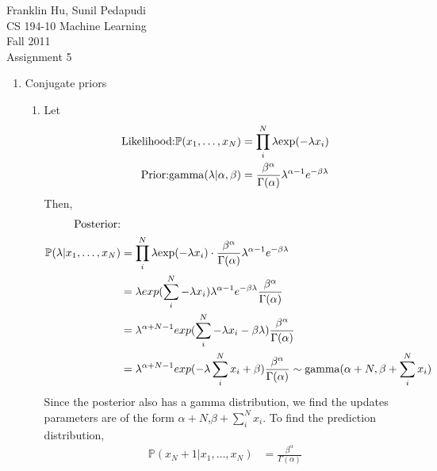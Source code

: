 \documentclass{article}
\begin{document}
Franklin Hu, Sunil Pedapudi \\
CS 194-10 Machine Learning \\
Fall 2011 \\
Assignment 5 \\

\newcommand{\pr}{\mathbb{P}}

\begin{enumerate}
    \item Conjugate priors %
        \begin{enumerate}
            \item %
                Let
                \begin{align*}
                    \textnormal{Likelihood:} \pr(x_1,\hdots,x_N) &=
                        \prod_i^N\lambda\mathrm{exp}(-\lambda x_i)\\
                    \textnormal{Prior:} \mathrm{gamma}(\lambda|\alpha,\beta) &=
                        \frac{\beta^\alpha}{\Gamma(\alpha)}\lambda^{\alpha-1}e^{-\beta\lambda}
                \end{align*}
                Then,
                \begin{align*}
                    \textnormal{Posterior:}\\
                    \pr(\lambda|x_1,\hdots,x_N) &=
                        \prod_i^N\lambda\mathrm{exp}(-\lambda x_i)\cdot
                        \frac{\beta^\alpha}{\Gamma(\alpha)}
                        \lambda^{\alpha-1}e^{-\beta\lambda}\\
                    &=  \lambda exp(\sum_i^N -\lambda x_i)
                        \lambda^{\alpha-1}e^{-\beta\lambda}
                        \frac{\beta^\alpha}{\Gamma(\alpha)}\\
                    &=  \lambda^{\alpha+N-1}exp(\sum_i^N -\lambda x_i - \beta\lambda)
                        \frac{\beta^\alpha}{\Gamma(\alpha)}\\
                    &=  \lambda^{\alpha+N-1}exp(-\lambda\sum_i^Nx_i + \beta)
                        \frac{\beta^\alpha}{\Gamma(\alpha)}
                        \sim \textnormal{gamma}(\alpha+N,\beta+\sum_i^Nx_i)
                \end{align*}
                Since the posterior also has a gamma distribution, we find the
                updates parameters are of the form \(\alpha+N\),\(\beta+\sum_i^Nx_i\).
                To find the prediction distribution,
                \begin{align*}
                    \pr(x_N+1|x_1,\hdots,x_N) &= \frac{\beta^\alpha}{\Gamma(\alpha)}

\end{align*}
\end{enumerate}
\end{enumerate}
\end{document}
